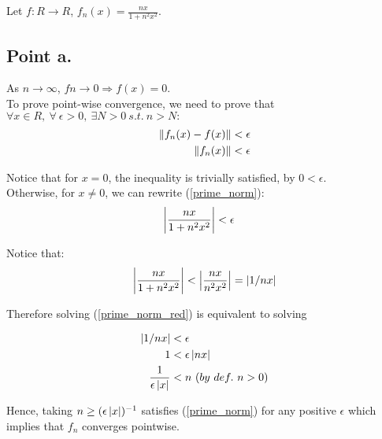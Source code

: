 \begin{homeworkProblem}

Let $f: R \xrightarrow{} R$, $f_{n}(x) = \frac{nx}{1+n^{2}x^{2}}$.

\subsection{Point a.}

As $n \xrightarrow{} \infty$, $fn \xrightarrow{} 0 \Longrightarrow f(x) = 0$.\\ 
To prove point-wise convergence, we need to prove that $\forall x \in R,\ \forall \ \epsilon > 0,\ \exists N > 0\ s.t.\ n > N :$ 
\begin{equation} \label{prime_norm}
    \begin{split}
        \left\lVert f_{n}(x) - f(x)\right\rVert & < \epsilon \\
        \left\lVert f_{n}(x)\right\rVert & < \epsilon
    \end{split}
\end{equation}

Notice that for $x = 0$, the inequality is trivially satisfied, by $0 < \epsilon$. \\

Otherwise, for $x \neq 0$, we can rewrite (\ref{prime_norm}):
\begin{equation} \label{prime_norm_red}
    \begin{split}
        \left\lvert\frac{nx}{1+n^{2}x^{2}}\right\rvert & < \epsilon
    \end{split}    
\end{equation}

Notice that:
\begin{equation}
    \left\lvert\frac{nx}{1+n^{2}x^{2}}\right\rvert < \left\lvert\frac{nx}{n^{2}x^{2}}\right\rvert = \left\lvert1 / nx\right\rvert 
\end{equation}

Therefore solving (\ref{prime_norm_red}) is equivalent to solving

\begin{equation}
    \begin{split}
        \left\lvert1/nx\right\rvert & < \epsilon\\
        1 & < \epsilon \left\lvert n x\right\rvert\\
        \frac{1}{\epsilon \left\lvert x\right\rvert} & < n \ (by \ def. \ n > 0)
    \end{split}
\end{equation}

Hence, taking $n \geq (\epsilon \left\lvert x\right\rvert)^{-1}$ satisfies (\ref{prime_norm}) for any positive $\epsilon$ which implies that $f_{n}$ converges pointwise. 


\end{homeworkProblem}

